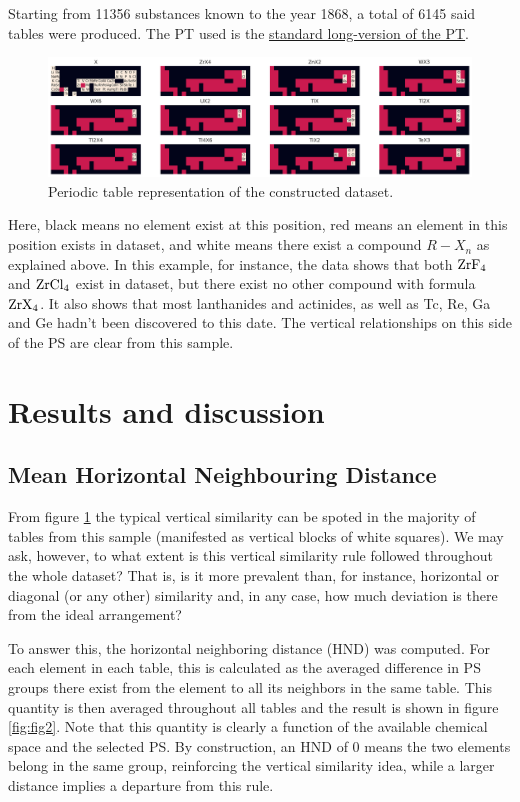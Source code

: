 \documentclass[]{article}
\begin{document}
Starting from 11356 substances known to the year 1868, a total of 6145 said tables were produced. The PT used is the \href{https://www.chemicool.com/longperiodictable.html}{standard long-version of the PT}.

\begin{figure}[h!]
  \centering
	\includegraphics[width=18.0cm]{tables.png}
	\caption{Periodic table representation of the constructed dataset.}
	\label{fig:fig1}
\end{figure}

Here, black means no element exist at this position, red means an element in this position exists in dataset, and white means there exist a compound $R-X_n$ as explained above. In this example, for instance, the data shows that both $\ce{ZrF4}$ and $\ce{ZrCl4}$ exist in dataset, but there exist no other compound with formula $\ce{ZrX4}$. It also shows that most lanthanides and actinides, as well as Tc, Re, Ga and Ge hadn't been discovered to this date. The vertical relationships on this side of the PS are clear from this sample.

\section{Results and discussion}

\subsection{Mean Horizontal Neighbouring Distance}
From figure \ref{fig:fig1} the typical vertical similarity can be spoted in the majority of tables from this sample (manifested as vertical blocks of white squares). We may ask, however, to what extent is this vertical similarity rule followed throughout the whole dataset? That is, is it more prevalent than, for instance, horizontal or diagonal (or any other) similarity and, in any case, how much deviation is there from the ideal arrangement?

To answer this, the horizontal neighboring distance (HND) was computed. For each element in each table, this is calculated as the averaged difference in PS groups there exist from the element to all its neighbors in the same table. This quantity is then averaged throughout all tables and the result is shown in figure \ref{fig:fig2}. Note that this quantity is clearly a function of the available chemical space and the selected PS. By construction, an HND of 0 means the two elements belong in the same group, reinforcing the vertical similarity idea, while a larger distance implies a departure from this rule.
\end{document}
